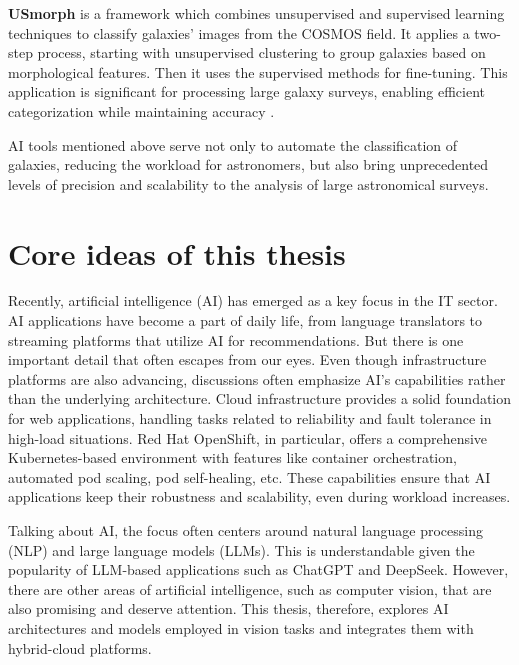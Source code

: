 \medskip

\textbf{USmorph} is a framework which combines unsupervised and supervised learning techniques to classify galaxies' images from the COSMOS field. It applies a two-step process, starting with unsupervised clustering to group galaxies based on morphological features. Then it uses the supervised methods for fine-tuning. This application is significant for processing large galaxy surveys, enabling efficient categorization while maintaining accuracy \cite{song2024usmorphupdatedframeworkautomatic}.

\medskip

AI tools mentioned above serve not only to automate the classification of galaxies, reducing the workload for astronomers, but also bring unprecedented levels of precision and scalability to the analysis of large astronomical surveys.

\chapter{Core ideas of this thesis}
\label{chapter:core-idea}

Recently, artificial intelligence (AI) has emerged as a key focus in the IT sector. AI applications have become a part of daily life, from language translators to streaming platforms that utilize AI for recommendations. But there is one important detail that often escapes from our eyes. Even though infrastructure platforms are also advancing, discussions often emphasize AI's capabilities rather than the underlying architecture. Cloud infrastructure provides a solid foundation for web applications, handling tasks related to reliability and fault tolerance in high-load situations. Red Hat OpenShift, in particular, offers a comprehensive Kubernetes-based environment with features like container orchestration, automated pod scaling, pod self-healing, etc. These capabilities ensure that AI applications keep their robustness and scalability, even during workload increases.

Talking about AI, the focus often centers around natural language processing (NLP) and large language models (LLMs). This is understandable given the popularity of LLM-based applications such as ChatGPT and DeepSeek. However, there are other areas of artificial intelligence, such as computer vision, that are also promising and deserve attention. This thesis, therefore, explores AI architectures and models employed in vision tasks and integrates them with hybrid-cloud platforms.

